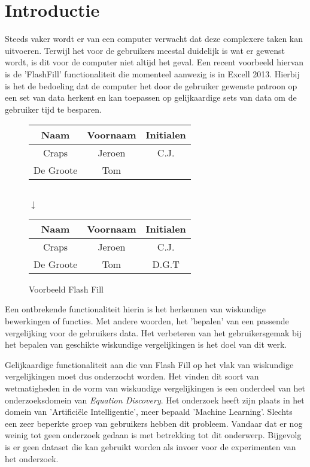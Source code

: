 \documentclass[Main.tex]{subfiles}
\begin{document}
\section{Introductie}
Steeds vaker wordt er van een computer verwacht dat deze complexere taken kan uitvoeren. Terwijl het voor de gebruikers meestal duidelijk is wat er gewenst wordt, is dit voor de computer niet altijd het geval. Een recent voorbeeld hiervan is de 'FlashFill' functionaliteit die momenteel aanwezig is in Excell 2013. Hierbij is het de bedoeling dat de computer het door de gebruiker gewenste patroon op een set van data herkent en kan toepassen op gelijkaardige sets van data om de gebruiker tijd te besparen. \cite{flashFill}

\begin{figure}[!htb]
\centering
\begin{framed}
\begin{tabular}{| c | c | c |}
\hline
Naam & Voornaam & Initialen \\ \hline
Craps & Jeroen & C.J. \\ \hline
De Groote & Tom &  \\ \hline
\end{tabular} \\
$\downarrow$ \\
\begin{tabular}{| c | c | c |}
\hline
Naam & Voornaam & Initialen \\ \hline
Craps & Jeroen & C.J. \\ \hline
De Groote & Tom &  D.G.T \\ \hline
\end{tabular}
\end{framed}
\caption{Voorbeeld Flash Fill}
\label{fig:flashfill}
\end{figure}

\par Een ontbrekende functionaliteit hierin is het herkennen van wiskundige bewerkingen of functies. Met andere woorden, het 'bepalen' van een passende vergelijking voor de gebruikers data. Het verbeteren van het gebruikersgemak bij het bepalen van geschikte wiskundige vergelijkingen is het doel van dit werk. \par  %

Gelijkaardige functionaliteit aan die van Flash Fill op het vlak van wiskundige vergelijkingen moet dus onderzocht worden. Het vinden dit soort van wetmatigheden in de vorm van wiskundige vergelijkingen is een onderdeel van het onderzoeksdomein van \textit{Equation Discovery\cite{equationDisc}}. Het onderzoek heeft zijn plaats in het domein van 'Artifici\"ele Intelligentie', meer bepaald 'Machine Learning'. Slechts een zeer beperkte groep van gebruikers hebben dit probleem. Vandaar dat er nog weinig tot geen onderzoek gedaan is met betrekking tot dit onderwerp. Bijgevolg is er geen dataset die kan gebruikt worden als invoer voor de experimenten van het onderzoek.  \par
\end{document}
